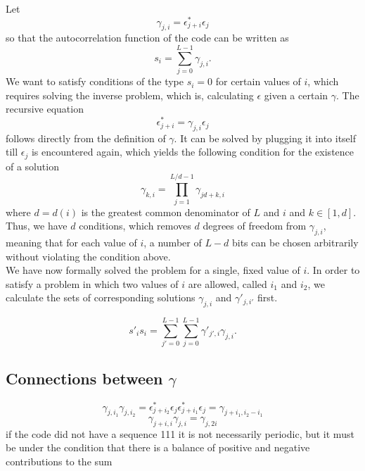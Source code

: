 \documentclass[18pt,a4paper]{extarticle}
\begin{document}
Let
\begin{equation}
\gamma_{j, i} = \epsilon_{j + i}^*\epsilon_{j}
\end{equation}
so that the autocorrelation function of the code can be written as
\begin{equation}
s_i = \sum_{j=0}^{L-1}\gamma_{j, i}.
\end{equation}
We want to satisfy conditions of the type $s_i=0$ for certain values of $i$, which requires solving the inverse problem, which is, calculating $\epsilon$ given a certain $\gamma$.
The recursive equation
\begin{equation}
\epsilon_{j + i}^* = \gamma_{j, i} \epsilon_{j}
\end{equation}
follows directly from the definition of $\gamma$.
It can be solved by plugging it into itself till $\epsilon_j$ is encountered again, which yields the following condition for the existence of a solution
\begin{equation}
\gamma_{k, i} = \prod_{j=1}^{L/d - 1}\gamma_{jd + k, i}
\end{equation}
where $d=d(i)$ is the greatest common denominator of $L$ and $i$ and $k \in [1, d]$.
Thus, we have $d$ conditions, which removes $d$ degrees of freedom from $\gamma_{j, i}$, meaning that for each value of $i$, a number of $L-d$ bits can be chosen arbitrarily without violating the condition above.\\
We have now formally solved the problem for a single, fixed value of $i$.
In order to satisfy a problem in which two values of $i$ are allowed, called $i_1$ and $i_2$, we calculate the sets of corresponding solutions $\gamma_{j, i}$ and $\gamma'_{j, i'}$ first.

\begin{equation}
s'_i s_i = \sum_{j'=0}^{L-1}\sum_{j=0}^{L-1}\gamma'_{j', i}\gamma_{j, i}.
\end{equation}

\subsection{Connections between $\gamma$}
\begin{equation}
\gamma_{j, i_1}\gamma_{j, i_2} = \epsilon_{j + i_2}^*\epsilon_{j}\epsilon_{j + i_1}^*\epsilon_{j} = \gamma_{j+i_1, i_2-i_1}
\end{equation}
\begin{equation}
\gamma_{j+i, i}\gamma_{j, i}=\gamma_{j, 2i}
\end{equation}
\newpage
if the code did not have a sequence 111 it is not necessarily periodic, but it must be under the condition that there is a balance of positive and negative contributions to the sum
\end{document}
